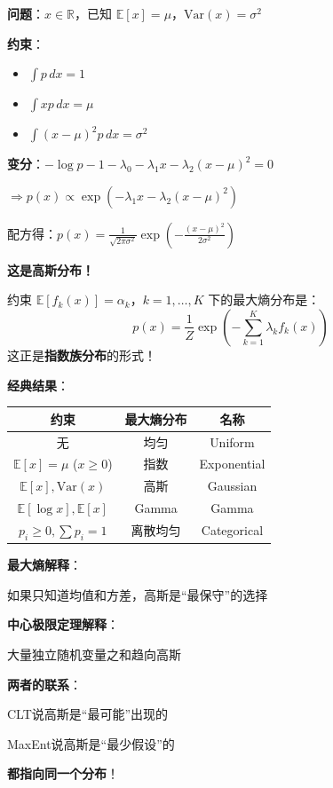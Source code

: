 \documentclass[12pt, a4paper]{ctexart}
\begin{document}
\begin{blackboard}[例3：给定均值和方差的最大熵]

\textbf{问题}：$x \in \mathbb{R}$，已知 $\mathbb{E}[x] = \mu$，$\text{Var}(x) = \sigma^2$

\textbf{约束}：
\begin{itemize}
    \item $\int p \, dx = 1$
    \item $\int x p \, dx = \mu$
    \item $\int (x - \mu)^2 p \, dx = \sigma^2$
\end{itemize}

\textbf{变分}：$-\log p - 1 - \lambda_0 - \lambda_1 x - \lambda_2 (x-\mu)^2 = 0$

$\Rightarrow p(x) \propto \exp\left( -\lambda_1 x - \lambda_2 (x-\mu)^2 \right)$

配方得：$p(x) = \frac{1}{\sqrt{2\pi\sigma^2}} \exp\left( -\frac{(x-\mu)^2}{2\sigma^2} \right)$

\textbf{这是高斯分布！}

\end{blackboard}

\begin{blackboard}[最大熵与指数族]

\begin{keypoint}[最大熵分布的一般形式]
约束 $\mathbb{E}[f_k(x)] = \alpha_k$，$k = 1, \ldots, K$ 下的最大熵分布是：
\[
\boxed{p(x) = \frac{1}{Z} \exp\left( -\sum_{k=1}^K \lambda_k f_k(x) \right)}
\]
这正是\textbf{指数族分布}的形式！
\end{keypoint}

\textbf{经典结果}：
\begin{center}
\begin{tabular}{c|c|c}
约束 & 最大熵分布 & 名称 \\
\hline
无 & 均匀 & Uniform \\
$\mathbb{E}[x] = \mu$ ($x \geq 0$) & 指数 & Exponential \\
$\mathbb{E}[x], \text{Var}(x)$ & 高斯 & Gaussian \\
$\mathbb{E}[\log x], \mathbb{E}[x]$ & Gamma & Gamma \\
$p_i \geq 0, \sum p_i = 1$ & 离散均匀 & Categorical
\end{tabular}
\end{center}

\end{blackboard}

\begin{blackboard}[为什么高斯分布如此常见？]

\textbf{最大熵解释}：

如果只知道均值和方差，高斯是``最保守''的选择

\textbf{中心极限定理解释}：

大量独立随机变量之和趋向高斯

\textbf{两者的联系}：

CLT说高斯是``最可能''出现的

MaxEnt说高斯是``最少假设''的

\textbf{都指向同一个分布}！

\end{blackboard}
\end{document}
